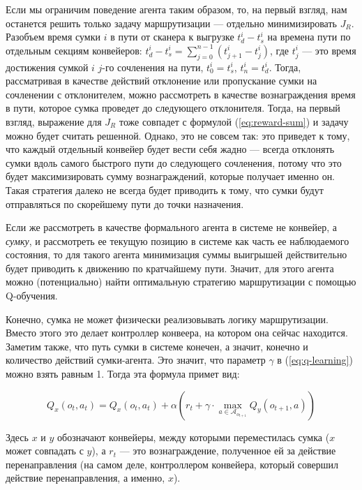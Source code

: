 \documentclass[specification,annotation,times]{itmo-student-thesis}
\theoremstyle{definition}
\begin{document}
Если мы ограничим поведение агента таким образом, то, на первый взгляд, нам
останется решить только задачу маршрутизации --- отдельно минимизировать $J_R$.
Разобъем время сумки $i$ в пути от сканера к выгрузке $t_d^i - t_s^i$ на времена
пути по отдельным секциям конвейеров:
$t_d^i - t_s^i = \sum\limits_{j=0}^{n-1} (t_{j+1}^i - t_j^i)$, где $t_j^i$ ---
это время достижения сумкой $i$ $j$-го сочленения на пути, $t_0^i = t_s^i$,
$t_n^i = t_d^i$. Тогда, рассматривая в качестве действий отклонение или
пропускание сумки на сочленении с отклонителем, можно рассмотреть в качестве
вознаграждения время в пути, которое сумка проведет до следующего отклонителя.
Тогда, на первый взгляд, выражение для $J_R$ тоже совпадет с формулой
(\ref{eq:reward-sum}) и задачу можно будет считать решенной. Однако, это не
совсем так: это приведет к тому, что каждый отдельный конвейер будет вести себя
жадно --- всегда отклонять сумки вдоль самого быстрого пути до следующего
сочленения, потому что это будет максимизировать сумму вознаграждений, которые
получает именно он. Такая стратегия далеко не всегда будет приводить к тому, что
сумки будут отправляться по скорейшему пути до точки назначения.

Если же рассмотреть в качестве формального агента в системе не
конвейер, а \textit{сумку}, и рассмотреть ее текущую позицию в системе как часть
ее наблюдаемого состояния, то для такого агента минимизация суммы выигрышей
действительно будет приводить к движению по кратчайшему пути. Значит, для этого
агента можно (потенциально) найти оптимальную стратегию маршрутизации с помощью
Q-обучения.

Конечно, сумка не может физически реализовывать логику маршрутизации. Вместо
этого это делает контроллер конвеера, на котором она сейчас находится.
Заметим также, что путь сумки в системе конечен, а значит, конечно и
количество действий сумки-агента. Это значит, что параметр $\gamma$ в
(\ref{eq:q-learning}) можно взять равным 1. Тогда эта формула примет вид:

\begin{equation}
Q_x(o_t, a_t) = Q_x(o_t, a_t) + \alpha \left( r_t +
\gamma \cdot \max\limits_{a \in \mathcal{A}_{o_{t+1}}} Q_y(o_{t+1}, a) \right)
\end{equation}

Здесь $x$ и $y$ обозначают конвейеры, между которыми переместилась сумка ($x$
может совпадать с $y$),
а $r_t$ --- это вознаграждение, полученное ей за действие перенаправления (на
самом деле, контроллером конвейера, который совершил действие перенаправления, а
именно, $x$).
\end{document}

